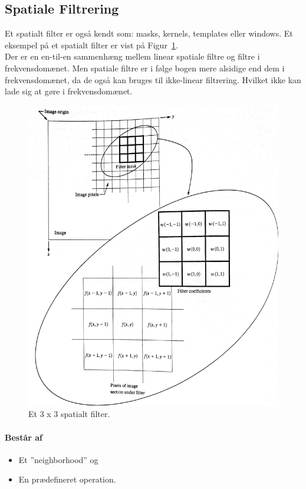 \subsection{Spatiale Filtrering}
Et spatialt filter er også kendt som: masks, kernels, templates eller windows. Et eksempel på et spatialt filter er vist på Figur~\ref{fig:spatial-filter}.\\

Der er en en-til-en sammenhæng mellem linear spatiale filtre og filtre i frekvensdomænet. Men spatiale filtre er i følge bogen mere alsidige end dem i frekvensdomænet, da de også kan bruges til ikke-linear filtrering. Hvilket ikke kan lade sig at gøre i frekvensdomænet.

\begin{figure}[H]
	\centering
	\includegraphics[width=0.8\linewidth]{figs/spm02/spatial-filter}
	\caption{Et 3 x 3 spatialt filter.}
	\label{fig:spatial-filter}
\end{figure}

\paragraph{Består af}

\begin{itemize}
	\item Et ''neighborhood'' og 
	\item En prædefineret operation.
\end{itemize}

